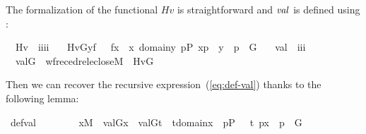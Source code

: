 The formalization of the functional $\mathit{Hv}$ is straightforward and $\operatorname{\mathit{val}}$ is defined using :
%
\begin{isabelle}
\isamarkupfalse%
\isanewline
\ \ Hv\ {\isacharcolon}{\isacharcolon}\ {\isachardoublequoteopen}i{\isasymRightarrow}i{\isasymRightarrow}i{\isasymRightarrow}i{\isachardoublequoteclose}\ \isanewline
\ \ {\isachardoublequoteopen}Hv{\isacharparenleft}G{\isacharcomma}y{\isacharcomma}f{\isacharparenright}\ {\isacharequal}{\isacharequal}\ {\isacharbraceleft}\ f{\isacharbackquote}x\ {\isachardot}{\isachardot}\ x{\isasymin}\ domain{\isacharparenleft}y{\isacharparenright}{\isacharcomma}\ {\isasymexists}p{\isasymin}P{\isachardot}\ {\isacharless}x{\isacharcomma}p{\isachargreater}\ {\isasymin}\ y\ {\isasymand}\ p\ {\isasymin}\ G\ {\isacharbraceright}{\isachardoublequoteclose}\isanewline
\isanewline
{}\isamarkupfalse%
\isanewline
\ \ val\ {\isacharcolon}{\isacharcolon}\ {\isachardoublequoteopen}i{\isasymRightarrow}i{\isasymRightarrow}i{\isachardoublequoteclose}\ \isanewline
\ \ {\isachardoublequoteopen}val{\isacharparenleft}G{\isacharcomma}{\isasymtau}{\isacharparenright}\ {\isacharequal}{\isacharequal}\ wfrec{\isacharparenleft}edrel{\isacharparenleft}eclose{\isacharparenleft}M{\isacharparenright}{\isacharparenright}{\isacharcomma}\ {\isasymtau}{\isacharcomma}\ Hv{\isacharparenleft}G{\isacharparenright}{\isacharparenright}{\isachardoublequoteclose}
\end{isabelle}
Then we can recover the recursive expression~(\ref{eq:def-val}) thanks to the
following lemma:
%
\begin{isabelle}
\isamarkupfalse%
\ def{\isacharunderscore}val{\isacharcolon}
\isanewline
\ \ \ \ \ \ \ \  {\isachardoublequoteopen}x{\isasymin}M\ {\isasymLongrightarrow}\ val{\isacharparenleft}G{\isacharcomma}x{\isacharparenright}\ {\isacharequal}\ {\isacharbraceleft}val{\isacharparenleft}G{\isacharcomma}t{\isacharparenright}\ {\isachardot}{\isachardot}\ t{\isasymin}domain{\isacharparenleft}x{\isacharparenright}\ {\isacharcomma}\ {\isasymexists}p{\isasymin}P\ {\isachardot}\ \ {\isasymlangle}t{\isacharcomma}\ p{\isasymrangle}{\isasymin}x\ {\isasymand}\ p\ {\isasymin}\ G\ {\isacharbraceright}{\isachardoublequoteclose}
\end{isabelle}

